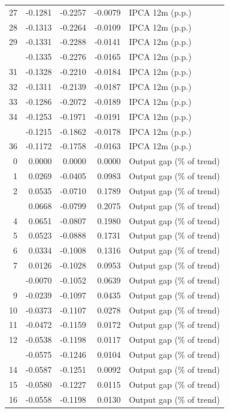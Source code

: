 \begin{tabular}{rrrrl}
27 & -0.1281 & -0.2257 & -0.0079 & IPCA 12m (p.p.)\\
28 & -0.1313 & -0.2264 & -0.0109 & IPCA 12m (p.p.)\\
29 & -0.1331 & -0.2288 & -0.0141 & IPCA 12m (p.p.)\\
\addlinespace
30 & -0.1335 & -0.2276 & -0.0165 & IPCA 12m (p.p.)\\
31 & -0.1328 & -0.2210 & -0.0184 & IPCA 12m (p.p.)\\
32 & -0.1311 & -0.2139 & -0.0187 & IPCA 12m (p.p.)\\
33 & -0.1286 & -0.2072 & -0.0189 & IPCA 12m (p.p.)\\
34 & -0.1253 & -0.1971 & -0.0191 & IPCA 12m (p.p.)\\
\addlinespace
35 & -0.1215 & -0.1862 & -0.0178 & IPCA 12m (p.p.)\\
36 & -0.1172 & -0.1758 & -0.0163 & IPCA 12m (p.p.)\\
0 & 0.0000 & 0.0000 & 0.0000 & Output gap (\% of trend)\\
1 & 0.0269 & -0.0405 & 0.0983 & Output gap (\% of trend)\\
2 & 0.0535 & -0.0710 & 0.1789 & Output gap (\% of trend)\\
\addlinespace
3 & 0.0668 & -0.0799 & 0.2075 & Output gap (\% of trend)\\
4 & 0.0651 & -0.0807 & 0.1980 & Output gap (\% of trend)\\
5 & 0.0523 & -0.0888 & 0.1731 & Output gap (\% of trend)\\
6 & 0.0334 & -0.1008 & 0.1316 & Output gap (\% of trend)\\
7 & 0.0126 & -0.1028 & 0.0953 & Output gap (\% of trend)\\
\addlinespace
8 & -0.0070 & -0.1052 & 0.0639 & Output gap (\% of trend)\\
9 & -0.0239 & -0.1097 & 0.0435 & Output gap (\% of trend)\\
10 & -0.0373 & -0.1107 & 0.0278 & Output gap (\% of trend)\\
11 & -0.0472 & -0.1159 & 0.0172 & Output gap (\% of trend)\\
12 & -0.0538 & -0.1198 & 0.0117 & Output gap (\% of trend)\\
\addlinespace
13 & -0.0575 & -0.1246 & 0.0104 & Output gap (\% of trend)\\
14 & -0.0587 & -0.1251 & 0.0092 & Output gap (\% of trend)\\
15 & -0.0580 & -0.1227 & 0.0115 & Output gap (\% of trend)\\
16 & -0.0558 & -0.1198 & 0.0130 & Output gap (\% of trend)\\

\end{tabular}
